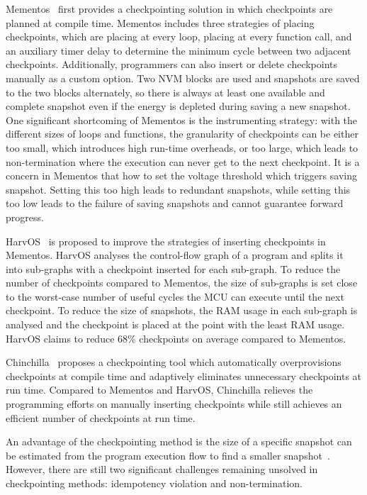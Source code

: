 Mementos~\cite{ransford2012mementos} first provides a checkpointing solution in which checkpoints are planned at compile time. Mementos includes three strategies of placing checkpoints, which are placing at every loop, placing at every function call, and an auxiliary timer delay to determine the minimum cycle between two adjacent checkpoints. Additionally, programmers can also insert or delete checkpoints manually as a custom option. Two NVM blocks are used and snapshots are saved to the two blocks alternately, so there is always at least one available and complete snapshot even if the energy is depleted during saving a new snapshot. One significant shortcoming of Mementos is the instrumenting strategy: with the different sizes of loops and functions, the granularity of checkpoints can be either too small, which introduces high run-time overheads, or too large, which leads to non-termination where the execution can never get to the next checkpoint. It is a concern in Mementos that how to set the voltage threshold which triggers saving snapshot. Setting this too high leads to redundant snapshots, while setting this too low leads to the failure of saving snapshots and cannot guarantee forward progress.

HarvOS~\cite{bhatti2017harvos} is proposed to improve the strategies of inserting checkpoints in Mementos. HarvOS analyses the control-flow graph of a program and splits it into sub-graphs with a checkpoint inserted for each sub-graph. To reduce the number of checkpoints compared to Mementos, the size of sub-graphs is set close to the worst-case number of useful cycles the MCU can execute until the next checkpoint. To reduce the size of snapshots, the RAM usage in each sub-graph is analysed and the checkpoint is placed at the point with the least RAM usage. HarvOS claims to reduce 68\% checkpoints on average compared to Mementos.

Chinchilla~\cite{maeng2018adaptive} proposes a checkpointing tool which automatically overprovisions checkpoints at compile time and adaptively eliminates unnecessary checkpoints at run time. Compared to Mementos and HarvOS, Chinchilla relieves the programming efforts on manually inserting checkpoints while still achieves an efficient number of checkpoints at run time.

An advantage of the checkpointing method is the size of a specific snapshot can be estimated from the program execution flow to find a smaller snapshot~\cite{bhatti2017harvos}. However, there are still two significant challenges remaining unsolved in checkpointing methods: idempotency violation and non-termination. 

